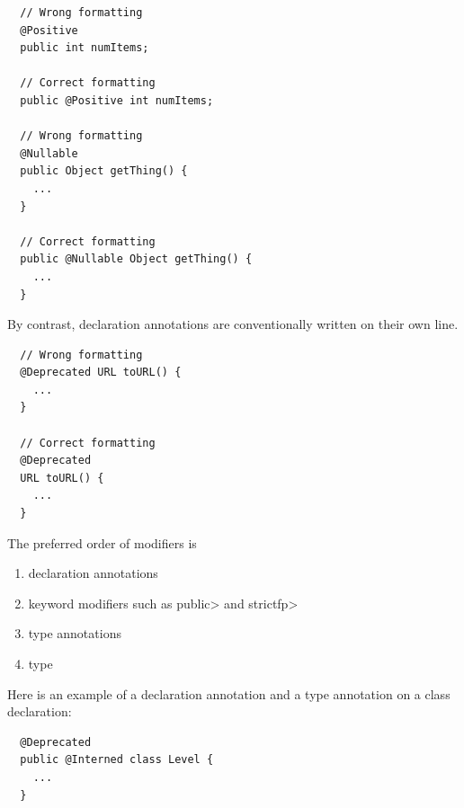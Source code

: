 \begin{Verbatim}
  // Wrong formatting
  @Positive
  public int numItems;

  // Correct formatting
  public @Positive int numItems;

  // Wrong formatting
  @Nullable
  public Object getThing() {
    ...
  }

  // Correct formatting
  public @Nullable Object getThing() {
    ...
  }
\end{Verbatim}

By contrast, declaration annotations are conventionally written on their own line.

\begin{Verbatim}
  // Wrong formatting
  @Deprecated URL toURL() {
    ...
  }

  // Correct formatting
  @Deprecated
  URL toURL() {
    ...
  }
\end{Verbatim}

The preferred order of modifiers is
\begin{enumerate}
\item declaration annotations
\item keyword modifiers such as \<public> and \<strictfp>
\item type annotations
\item type
\end{enumerate}

Here is an example of a declaration annotation and a type annotation on a class declaration:

\begin{Verbatim}
  @Deprecated
  public @Interned class Level {
    ...
  }
\end{Verbatim}

%
%
%
%

